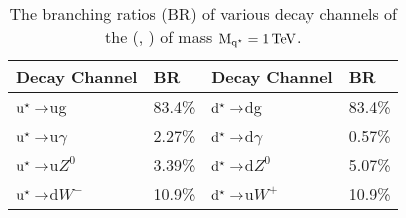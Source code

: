 \begin{table}[h!]
\begin{center}
\begin{tabular}{l|l||l|l}
\hline
\hline
 Decay Channel       & BR     & Decay Channel        & BR \\
\hline
$\mathrm{u^\star}\to$ug        & 83.4\% & $\mathrm{d^\star}\to$dg        & 83.4\% \\
$\mathrm{u^\star}\to$u$\gamma$ & 2.27\% & $\mathrm{d^\star}\to$d$\gamma$ & 0.57\% \\
$\mathrm{u^\star}\to$u$Z^{0}$  & 3.39\% & $\mathrm{d^\star}\to$d$Z^{0}$  & 5.07\% \\
$\mathrm{u^\star}\to$d$W^{-}$  & 10.9\% & $\mathrm{d^\star}\to$u$W^{+}$  & 10.9\% \\
\hline
\end{tabular}
\caption{The branching ratios (BR) of various decay channels of the \qstar (\ustar, \dstar) of mass $\mathrm{M_{q^\star}}=1\mathrm{\,TeV}$.}
   \label{Table:qstarBR}
\end{center}
\end{table}
